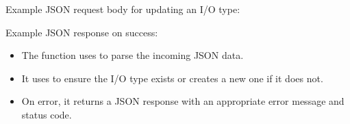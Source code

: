 \documentclass[letterpaper,10pt,english]{sphinxmanual}
\begin{document}
\begin{fulllineitems}
\begin{description}
\sphinxAtStartPar
Example JSON request body for updating an I/O type:

\begin{sphinxVerbatim}[commandchars=\\\{\}]
\end{sphinxVerbatim}

\sphinxAtStartPar
Example JSON response on success:

\begin{sphinxVerbatim}[commandchars=\\\{\}]
\end{sphinxVerbatim}

\begin{itemize}
\item {} 
\sphinxAtStartPar
The function uses  to parse the incoming JSON data.

\item {} 
\sphinxAtStartPar
It uses  to ensure the I/O type exists or creates a new one if it does not.

\item {} 
\sphinxAtStartPar
On error, it returns a JSON response with an appropriate error message and status code.

\end{itemize}

\end{description}

\end{fulllineitems}

\end{document}
